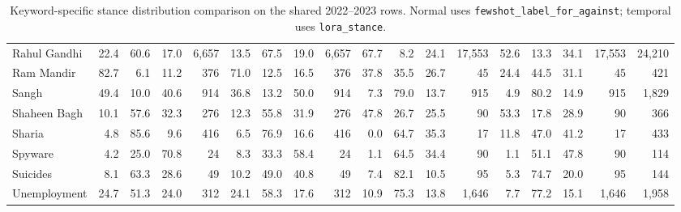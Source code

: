 \begin{table}[htbp]
\begin{adjustbox}{max width=\textwidth}
\begin{tabular}{lrrrrrrrrrrrrrrrrr}
Rahul Gandhi & 22.4 & 60.6 & 17.0 & 6,657 & 13.5 & 67.5 & 19.0 & 6,657 & 67.7 & 8.2 & 24.1 & 17,553 & 52.6 & 13.3 & 34.1 & 17,553 & 24,210 \\
Ram Mandir & 82.7 & 6.1 & 11.2 & 376 & 71.0 & 12.5 & 16.5 & 376 & 37.8 & 35.5 & 26.7 & 45 & 24.4 & 44.5 & 31.1 & 45 & 421 \\
Sangh & 49.4 & 10.0 & 40.6 & 914 & 36.8 & 13.2 & 50.0 & 914 & 7.3 & 79.0 & 13.7 & 915 & 4.9 & 80.2 & 14.9 & 915 & 1,829 \\
Shaheen Bagh & 10.1 & 57.6 & 32.3 & 276 & 12.3 & 55.8 & 31.9 & 276 & 47.8 & 26.7 & 25.5 & 90 & 53.3 & 17.8 & 28.9 & 90 & 366 \\
Sharia & 4.8 & 85.6 & 9.6 & 416 & 6.5 & 76.9 & 16.6 & 416 & 0.0 & 64.7 & 35.3 & 17 & 11.8 & 47.0 & 41.2 & 17 & 433 \\
Spyware & 4.2 & 25.0 & 70.8 & 24 & 8.3 & 33.3 & 58.4 & 24 & 1.1 & 64.5 & 34.4 & 90 & 1.1 & 51.1 & 47.8 & 90 & 114 \\
Suicides & 8.1 & 63.3 & 28.6 & 49 & 10.2 & 49.0 & 40.8 & 49 & 7.4 & 82.1 & 10.5 & 95 & 5.3 & 74.7 & 20.0 & 95 & 144 \\
Unemployment & 24.7 & 51.3 & 24.0 & 312 & 24.1 & 58.3 & 17.6 & 312 & 10.9 & 75.3 & 13.8 & 1,646 & 7.7 & 77.2 & 15.1 & 1,646 & 1,958 \\
\bottomrule
\end{tabular}
\end{adjustbox}
\caption{Keyword-specific stance distribution comparison on the shared 2022--2023 rows. Normal uses \texttt{fewshot\_label\_for\_against}; temporal uses \texttt{lora\_stance}.}
\label{tab:keyword-stance-normal-vs-temporal}
\end{table}

